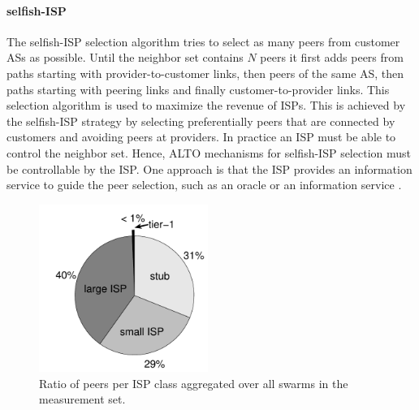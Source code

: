 \paragraph{selfish-ISP}
The selfish-ISP selection algorithm tries to select as many peers from customer ASs as possible. Until the neighbor set contains $N$ peers it first adds peers from paths starting with provider-to-customer links, then peers of the same AS, then paths starting with peering links and finally customer-to-provider links.
This selection algorithm is used to maximize the revenue of ISPs. This is achieved by the selfish-ISP strategy by selecting preferentially peers that are connected by customers and avoiding peers at providers. In practice an ISP must be able to control the neighbor set. Hence, ALTO mechanisms for selfish-ISP selection must be controllable by the ISP. One approach is that the ISP provides an information service to guide the peer selection, such as an oracle \cite{Aggarwal2007} or an information service \cite{hossfia}.

\begin{figure}[bt]
\centering
	\includegraphics[width=0.49\textwidth]{aslevel/p2p/methodology/figs/npeers_perTier}
 	\caption{Ratio of peers per ISP class aggregated over all swarms in the measurement set.}
 	\label{fig:npeers_perTier}
\end{figure}



